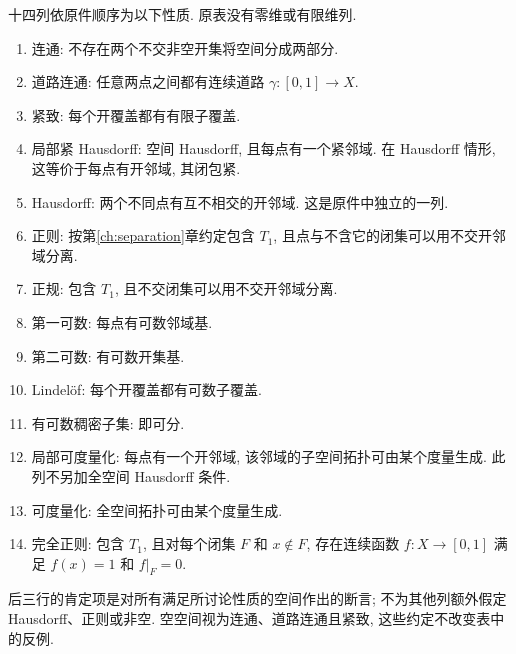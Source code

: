 \begin{exercise}
十四列依原件顺序为以下性质. 原表没有零维或有限维列.
\begin{enumerate}
\item 连通: 不存在两个不交非空开集将空间分成两部分.
\item 道路连通: 任意两点之间都有连续道路 $\gamma:[0,1]\to X$.
\item 紧致: 每个开覆盖都有有限子覆盖.
\item 局部紧 Hausdorff: 空间 Hausdorff, 且每点有一个紧邻域. 在 Hausdorff 情形, 这等价于每点有开邻域, 其闭包紧.
\item Hausdorff: 两个不同点有互不相交的开邻域. 这是原件中独立的一列.
\item 正则: 按第\ref{ch:separation}章约定包含 $T_1$, 且点与不含它的闭集可以用不交开邻域分离.
\item 正规: 包含 $T_1$, 且不交闭集可以用不交开邻域分离.
\item 第一可数: 每点有可数邻域基.
\item 第二可数: 有可数开集基.
\item Lindel\"of: 每个开覆盖都有可数子覆盖.
\item 有可数稠密子集: 即可分.
\item 局部可度量化: 每点有一个开邻域, 该邻域的子空间拓扑可由某个度量生成. 此列不另加全空间 Hausdorff 条件.
\item 可度量化: 全空间拓扑可由某个度量生成.
\item 完全正则: 包含 $T_1$, 且对每个闭集 $F$ 和 $x\notin F$, 存在连续函数 $f:X\to[0,1]$ 满足 $f(x)=1$ 和 $f|_F=0$.
\end{enumerate}
后三行的肯定项是对所有满足所讨论性质的空间作出的断言; 不为其他列额外假定 Hausdorff、正则或非空. 空空间视为连通、道路连通且紧致, 这些约定不改变表中的反例.
\end{exercise}

